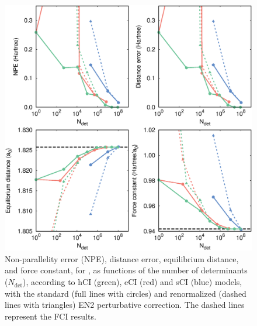 \documentclass[aip,jcp,preprint,noshowkeys,superscriptaddress]{revtex4-1}
\newcommand{\Ndet}{N_\text{det}}
\begin{document}
\begin{figure}%
\includegraphics[width=1.0\linewidth]{plot_pt2_rpt2_H7}
\caption{
\label{fig:plot_pt2_rpt2_h7}
Non-parallelity error (NPE), distance error, equilibrium distance, and force constant, for ,
as functions of the number of determinants ($\Ndet$), according to hCI (green), eCI (red) and sCI (blue) models,
with the standard (full lines with circles) and renormalized (dashed lines with triangles) EN2 perturbative correction.
The dashed lines represent the FCI results.}
\end{figure}
\end{document}
